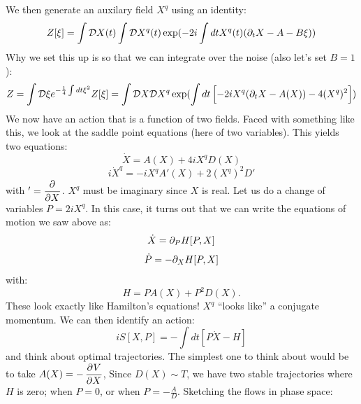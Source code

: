 We then generate an auxilary field $X^q$ using an identity:
\begin{equation}
    Z[\xi] = \int \mathcal{D}X(t)\int \mathcal{D}X^q(t)\exp(-2i\int dt X^q(t)(\partial_t X - A - B\xi))
\end{equation}
Why we set this up is so that we can integrate over the noise (also let's set $B = 1$):
\begin{equation}
    Z = \int \mathcal{D}\xi e^{-\frac{1}{4}\int dt \xi^2}Z[\xi] = \int \mathcal{D}X\mathcal{D}X^q \exp(\int dt \left[-2iX^q(\partial_t X - A(X)) - 4(X^q)^2\right])
\end{equation}
We now have an action that is a function of two fields. Faced with something like this, we look at the saddle point equations (here of two variables). This yields two equations:
\begin{equation}
    \dot{X} = A(X) + 4iX^qD(X)
\end{equation}
\begin{equation}
    i\dot{X}^q = -iX^qA'(X) + 2(X^q)^2D'
\end{equation}
with $' = \dpd{}{X}$. $X^q$ must be imaginary since $X$ is real. Let us do a change of variables $P = 2iX^q$. In this case, it turns out that we can write the equations of motion we saw above as:
\begin{equation}
    \dot{X} = \partial_P H[P, X]
\end{equation}
\begin{equation}
    \dot{P} = -\partial_X H[P, X]
\end{equation}
with:
\begin{equation}
    H = PA(X) + P^2 D(X).
\end{equation}
These look exactly like Hamilton's equations! $X^q$ ``looks like'' a conjugate momentum. We can then identify an action:
\begin{equation}
    iS[X, P] = - \int dt [P\dot{X} - H]
\end{equation}
and think about optimal trajectories. The simplest one to think about would be to take $A(X) = -\dpd{V}{X}$, Since $D(X) \sim T$, we have two stable trajectories where $H$ is zero; when $P = 0$, or when $P = -\frac{A}{D}$. Sketching the flows in phase space:

